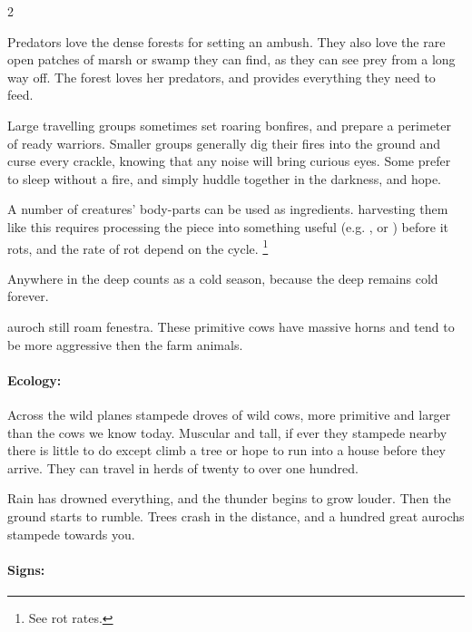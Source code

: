 \begin{multicols}{2}

\noindent
Predators love the dense forests for setting an ambush.
They also love the rare open patches of marsh or swamp they can find, as they can see prey from a long way off.
The forest loves her predators, and provides everything they need to feed.

Large travelling groups sometimes set roaring bonfires, and prepare a perimeter of ready warriors.
Smaller groups generally dig their fires into the ground and curse every crackle, knowing that any noise will bring curious eyes.
Some prefer to sleep without a fire, and simply huddle together in the darkness, and hope.

\rotRates
A number of creatures' body-parts can be used as \glspl{ingredient}.
\Gls{harvesting} them like this requires processing the piece into something useful (e.g. , or ) before it rots, and the rate of rot depend on the \gls{cycle}.%
\footnote{See  rot rates.}

Anywhere in the \gls{deep} counts as a cold season, because the \gls{deep} remains cold forever.

  {auroch}%
still roam \gls{fenestra}.
These primitive cows have massive horns and tend to be more aggressive then the farm animals.


\paragraph{Ecology:} Across the wild planes stampede droves of wild cows, more primitive and larger than the cows we know today.
Muscular and tall, if ever they stampede nearby there is little to do except climb a tree or hope to run into a house before they arrive.
They can travel in herds of twenty to over one hundred.

\begin{boxtext}
  Rain has drowned everything, and the thunder begins to grow louder.
  Then the ground starts to rumble.
  Trees crash in the distance, and a hundred great aurochs stampede towards you.
\end{boxtext}

\paragraph{Signs:}


\end{multicols}

